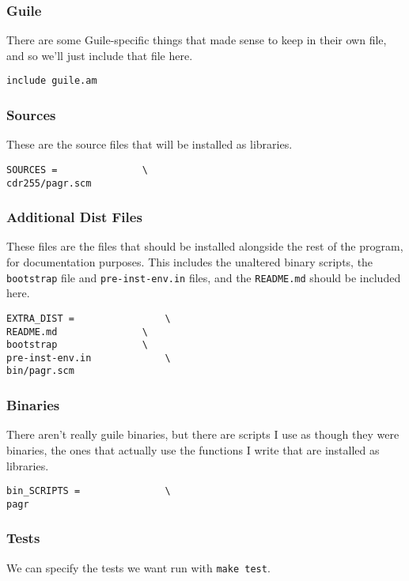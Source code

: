 \documentclass[11pt]{article}
\begin{document}
\subsubsection{Guile}
\label{sec:orga6786a1}
There are some Guile-specific things that made sense to keep in their own file,
and so we'll just include that file here.
\begin{verbatim}
include guile.am

\end{verbatim}

\subsubsection{Sources}
\label{sec:org5f10efb}
These are the source files that will be installed as libraries.

\begin{verbatim}
SOURCES =				\
cdr255/pagr.scm

\end{verbatim}

\subsubsection{Additional Dist Files}
\label{sec:org9a08586}
These files are the files that should be installed alongside the rest of the
program, for documentation purposes. This includes the unaltered binary scripts,
the \texttt{bootstrap} file and \texttt{pre-inst-env.in} files, and the \texttt{README.md} should be
included here.

\begin{verbatim}
EXTRA_DIST =				\
README.md				\
bootstrap				\
pre-inst-env.in				\
bin/pagr.scm

\end{verbatim}

\subsubsection{Binaries}
\label{sec:orge71ffbf}
There aren't really guile binaries, but there are scripts I use as though they
were binaries, the ones that actually use the functions I write that are
installed as libraries.

\begin{verbatim}
bin_SCRIPTS =				\
pagr

\end{verbatim}

\subsubsection{Tests}
\label{sec:orgb60b2f2}
We can specify the tests we want run with \texttt{make test}.
\end{document}
